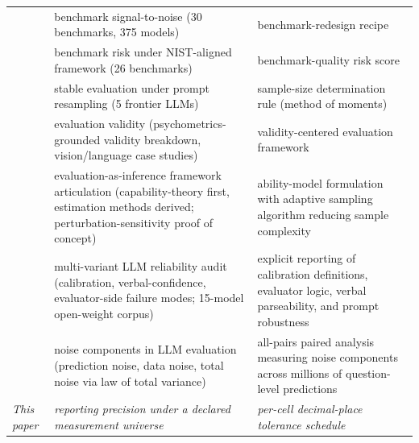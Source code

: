 \documentclass[11pt]{article}
\begin{document}
\begin{table}[h]
\begin{tabular}{p{}p{}p{}}
\citet{heineman2025signal} & benchmark signal-to-noise (30 benchmarks, 375 models) & benchmark-redesign recipe \\
\citet{mcgregor2025benchrisk} & benchmark risk under NIST-aligned framework (26 benchmarks) & benchmark-quality risk score \\
\citet{lior2025reliableeval} & stable evaluation under prompt resampling (5 frontier LLMs) & sample-size determination rule (method of moments) \\
\citet{salaudeen2025measurement} & evaluation validity (psychometrics-grounded validity breakdown, vision/language case studies) & validity-centered evaluation framework \\
\citet{jo2025evalinference} & evaluation-as-inference framework articulation (capability-theory first, estimation methods derived; perturbation-sensitivity proof of concept) & ability-model formulation with adaptive sampling algorithm reducing sample complexity \\
\citet{karmakar2026singleprompt} & multi-variant LLM reliability audit (calibration, verbal-confidence, evaluator-side failure modes; 15-model open-weight corpus) & explicit reporting of calibration definitions, evaluator logic, verbal parseability, and prompt robustness \\
\citet{wang2025measuringnoises} & noise components in LLM evaluation (prediction noise, data noise, total noise via law of total variance) & all-pairs paired analysis measuring noise components across millions of question-level predictions \\
\midrule
\textit{This paper} & \textit{reporting precision under a declared measurement universe} & \textit{per-cell decimal-place tolerance schedule} \\
\bottomrule
\end{tabular}
\end{table}
\end{document}
